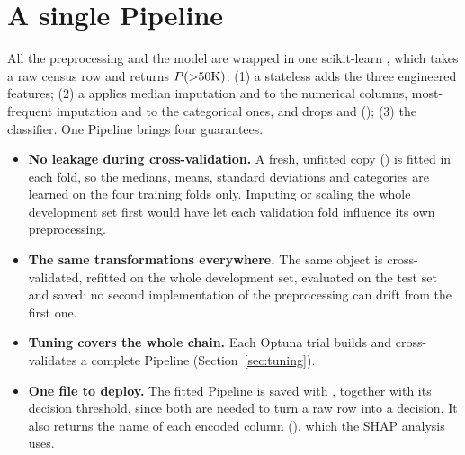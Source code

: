 \section{A single Pipeline}
\label{sec:pipeline}

All the preprocessing and the model are wrapped in one scikit-learn
, which takes a raw census row and returns $P(\mbox{$>$50K})$:
(1) a stateless  adds the three engineered features;
(2) a  applies median imputation and
 to the numerical columns, most-frequent imputation and
 to the categorical ones, and
drops  and  (); (3) the
classifier. One Pipeline brings four guarantees.
\begin{itemize}
  \item \textbf{No leakage during cross-validation.} A fresh, unfitted copy
  () is fitted in each fold, so the medians, means, standard
  deviations and categories are learned on the four training folds only.
  Imputing or scaling the whole development set first would have let each
  validation fold influence its own preprocessing.
  \item \textbf{The same transformations everywhere.} The same object is
  cross-validated, refitted on the whole development set, evaluated on the
  test set and saved: no second implementation of the preprocessing can drift
  from the first one.
  \item \textbf{Tuning covers the whole chain.} Each Optuna trial builds and
  cross-validates a complete Pipeline (Section~\ref{sec:tuning}).
  \item \textbf{One file to deploy.} The fitted Pipeline is saved with
  , together with its decision threshold, since both are needed
  to turn a raw row into a decision. It also returns the name of each encoded
  column (), which the SHAP analysis uses.
\end{itemize}
